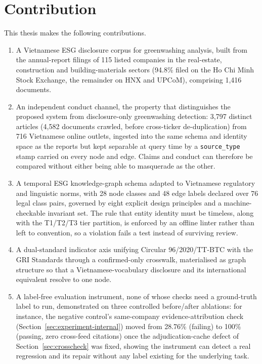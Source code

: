 \documentclass[fontsize=12pt,oneside,headings=small]{scrreprt}
\begin{document}
\section{Contribution}
\label{sec:contribution}

This thesis makes the following contributions.

\begin{enumerate}
    \item A Vietnamese ESG disclosure corpus for greenwashing analysis, built from the annual-report filings of 115 listed companies in the real-estate, construction and building-materials sectors (94.8\% filed on the Ho Chi Minh Stock Exchange, the remainder on HNX and UPCoM), comprising 1{,}416 documents.

    \item An independent conduct channel, the property that distinguishes the proposed system from disclosure-only greenwashing detection: 3{,}797 distinct articles (4{,}582 documents crawled, before cross-ticker de-duplication) from 716 Vietnamese online outlets, ingested into the same schema and identity space as the reports but kept separable at query time by a \texttt{source\_type} stamp carried on every node and edge. Claims and conduct can therefore be compared without either being able to masquerade as the other.

    \item A temporal ESG knowledge-graph schema adapted to Vietnamese regulatory and linguistic norms, with 28 node classes and 48 edge labels declared over 76 legal class pairs, governed by eight explicit design principles and a machine-checkable invariant set. The rule that entity identity must be timeless, along with the T1/T2/T3 tier partition, is enforced by an offline linter rather than left to convention, so a violation fails a test instead of surviving review.

    \item A dual-standard indicator axis unifying Circular 96/2020/TT-BTC with the GRI Standards through a confirmed-only crosswalk, materialised as graph structure so that a Vietnamese-vocabulary disclosure and its international equivalent resolve to one node.

    \item A label-free evaluation instrument, none of whose checks need a ground-truth label to run, demonstrated on three controlled before/after ablations: for instance, the negative control's same-company evidence-attribution check (Section~\ref{sec:experiment-internal}) moved from 28.76\% (failing) to 100\% (passing, zero cross-feed citations) once the adjudication-cache defect of Section~\ref{sec:crosscheck} was fixed, showing the instrument can detect a real regression and its repair without any label existing for the underlying task.


\end{enumerate}
\end{document}
